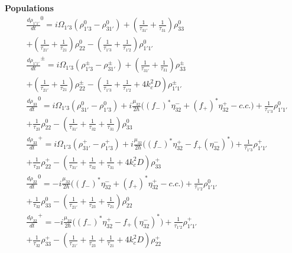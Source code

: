 \documentclass[10pt,english,fleqn]{article}%
\begin{document}
\textbf{Populations}
\begin{align*}
&\frac{d \rho_{1'1'}}{d t}^{0} = i\Omega_{1'3} (\rho_{1'3}^{0} - \rho_{31'}^{0}) + (\frac{1}{\tau_{31'}} + \frac{1}{\tau_{31}})\rho_{33}^{0}  \nonumber \\ 
& + (\frac{1}{\tau_{21'}} + \frac{1}{\tau_{21}})\rho_{22}^{0} - (\frac{1}{\tau_{1'3}}  + \frac{1}{\tau_{1'2}} )\rho_{1'1'}^{0} \\
&\frac{d \rho_{1'1'}}{d t}^{\pm} = i\Omega_{1'3} (\rho_{1'3}^{\pm} - \rho_{31'}^{\pm}) + (\frac{1}{\tau_{31'}} + \frac{1}{\tau_{31}})\rho_{33}^{\pm}  \nonumber \\ 
& + (\frac{1}{\tau_{21'}} + \frac{1}{\tau_{21}})\rho_{22}^{\pm} - (\frac{1}{\tau_{1'3}} + \frac{1}{\tau_{1'2}} +4k_c^2D )\rho_{1'1'}^{\pm} \\
&\frac{d \rho_{33}}{d t}^0 = i\Omega_{1'3} (\rho_{31'}^0 - \rho_{1'3}^0) + i\frac{\mu_{32}}{2\hbar} \big ((f_{-})^*\eta_{32}^{-}+(f_{+})^*\eta_{32}^{+} - c.c. \big )+ \frac{1}{\tau_{1'3}} 
\rho_{1'1'}^0 \nonumber \\ 
& +  \frac{1}{\tau_{23}}\rho_{22}^0 - (\frac{1}{\tau_{31'}} + \frac{1}{\tau_{32}} + \frac{1}{\tau_{31}}) \rho_{33}^0 \\
&\frac{d \rho_{33}}{d t}^{+}   = i\Omega_{1'3} (\rho_{31'}^{+} - \rho_{1'3}^{+}) + i\frac{\mu_{32}}{2\hbar}\big ( (f_{-})^*\eta_{32}^{+}-f_{+}(\eta_{32}^{-})^* \big ) 
+ \frac{1}{\tau_{1'3}}\rho_{1'1'}^+ \nonumber \\ 
& +  \frac{1}{\tau_{23}}\rho_{22}^+ - (\frac{1}{\tau_{31'}} + \frac{1}{\tau_{32}} + \frac{1}{\tau_{31}} +4k_c^2D) \rho_{33}^+ \\
&\frac{d \rho_{22}}{d t}^{0}  = -i\frac{\mu_{32}}{2\hbar} \big ((f_{-})^*\eta_{32}^{-}+(f_{+})^*\eta_{32}^{+} - c.c. \big ) + \frac{1}{\tau_{1'2}}\rho_{1'1'}^0 \\ 
& +  \frac{1}{\tau_{32}}\rho_{33}^{0} - (\frac{1}{\tau_{21'}} + \frac{1}{\tau_{23}} + \frac{1}{\tau_{21}}) \rho_{22}^0 \\
&\frac{d \rho_{22}}{d t}^{+}   = - i\frac{\mu_{32}}{2\hbar}\big ( (f_{-})^*\eta_{32}^{+}-f_{+}(\eta_{32}^{-})^* \big )  + \frac{1}{\tau_{1'2}}\rho_{1'1'}^+ \\ 
& +  \frac{1}{\tau_{32}}\rho_{33}^+ - (\frac{1}{\tau_{21'}} + \frac{1}{\tau_{23}} + \frac{1}{\tau_{21}} +4k_c^2D) \rho_{22}^+ \\
\end{align*}
\end{document}
